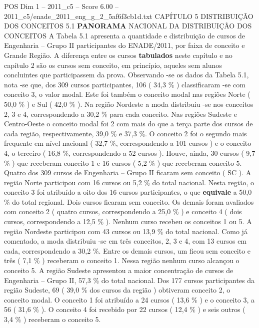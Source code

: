 \begin{textsample}{POS Dim 1 – 2011\_c5 – Score 6.00 – 2011\_c5/enade\_2011\_eng\_g\_2\_5af6f3cb1d.txt}  \label{ex:f1_pos_130}
CAPÍTULO 5 DISTRIBUIÇÃO DOS CONCEITOS 5.1 \textbf{PANORAMA} NACIONAL DA DISTRIBUIÇÃO DOS CONCEITOS A Tabela 5.1 apresenta a quantidade e distribuição de cursos de Engenharia – Grupo II participantes do ENADE/2011, por faixa de conceito e Grande Região.
A diferença entre os cursos \textbf{tabulados} neste capítulo e no capítulo 2 são os cursos sem conceito, em princípio, aqueles sem alunos concluintes que participassem da prova.
Observando -se os dados da Tabela 5.1, nota -se que, dos 309 cursos participantes, 106 ( 34,3 \% ) classificaram -se com conceito 3, o valor modal.
Este foi também o conceito modal nas regiões Norte ( 50,0 \% ) e Sul ( 42,0 \% ).
Na região Nordeste a moda distribuiu -se nos conceitos 2, 3 e 4, correspondendo a 30,2 \% para cada conceito.
Nas regiões Sudeste e Centro-Oeste o conceito modal foi 2 com mais do que a terça parte dos cursos de cada região, respectivamente, 39,0 \% e 37,3 \%.
O conceito 2 foi o segundo mais frequente em nível nacional ( 32,7 \%, correspondendo a 101 cursos ) e o conceito 4, o terceiro ( 16,8 \%, correspondendo a 52 cursos ).
Houve, ainda, 30 cursos ( 9,7 \% ) que receberam conceito 1 e 16 cursos ( 5,2 \% ) que receberam conceito 5.
Quatro dos 309 cursos de Engenharia – Grupo II ficaram sem conceito ( SC ).
A região Norte participou com 16 cursos ou 5,2 \% do total nacional.
Nesta região, o conceito 3 foi atribuído a oito dos 16 cursos participantes, o que \textbf{equivale} a 50,0 \% do total regional.
Dois cursos ficaram sem conceito.
Os demais foram avaliados com conceito 2 ( quatro cursos, correspondendo a 25,0 \% ) e conceito 4 ( dois cursos, correspondendo a 12,5 \% ).
Nenhum curso recebeu os conceitos 1 ou 5.
A região Nordeste participou com 43 cursos ou 13,9 \% do total nacional.
Como já comentado, a moda distribuiu -se em três conceitos, 2, 3 e 4, com 13 cursos em cada, correspondendo a 30,2 \%.
Entre os demais cursos, um ficou sem conceito e três ( 7,1 \% ) receberam o conceito 1.
Nessa região nenhum curso alcançou o conceito 5.
A região Sudeste apresentou a maior concentração de cursos de Engenharia – Grupo II, 57,3 \% do total nacional.
Dos 177 cursos participantes da região Sudeste, 69 ( 39,0 \% dos cursos da região ) obtiveram conceito 2, o conceito modal.
O conceito 1 foi atribuído a 24 cursos ( 13,6 \% ) e o conceito 3, a 56 ( 31,6 \% ).
O conceito 4 foi recebido por 22 cursos ( 12,4 \% ) e seis outros ( 3,4 \% ) receberam o conceito 5.

\end{textsample}
